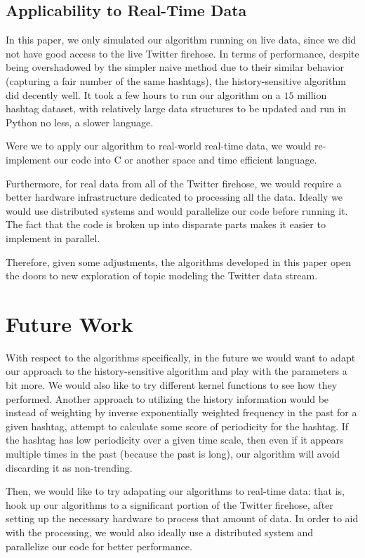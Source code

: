 \documentclass[twoside]{article}
\begin{document}
{\subsection{Applicability to Real-Time Data}

In this paper, we only simulated our algorithm running on live data, since we did not 
have good access to the live Twitter firehose. In terms of performance, despite being overshadowed
by the simpler naive method due to their similar behavior (capturing a fair number of the same hashtags), 
the history-sensitive algorithm did decently well. It took a few hours to run our algorithm 
on a $15$ million hashtag dataset, with relatively large data structures to be updated and run in Python no less, a slower language.

Were we to apply our algorithm to real-world real-time data, we would re-implement our code into C or another space and time efficient language. 

Furthermore, for real data from all of the Twitter firehose, we would require a better hardware infrastructure dedicated to processing all the data. Ideally we would use distributed systems and would
parallelize our code before running it. The fact that the code is broken up into disparate parts makes it easier to implement in parallel.

Therefore, given some adjustments, the algorithms developed in this paper open the doors to new exploration of topic modeling the Twitter data stream.


\section{Future Work} \label{sec:Future Work}

With respect to the algorithms specifically, in the future we would want to adapt our approach to the history-sensitive algorithm and play with the parameters a bit more. We would also like to try different kernel functions to see how they performed. Another approach to utilizing the history information would be instead of weighting by inverse exponentially weighted frequency in the past for a given hashtag, attempt to calculate some score of periodicity for the hashtag. If the hashtag has low periodicity over a given time scale, then even if it appears multiple times in the past (because the past is long), our algorithm will avoid discarding it as non-trending.

Then, we would like to try adapating our algorithms to real-time data: that is, hook up our algorithms to a significant portion of the Twitter firehose, after setting up the necessary hardware to process that amount of data. In order to aid with the processing, we would also ideally use a distributed system and parallelize
our code for better performance.

}
\end{document}
